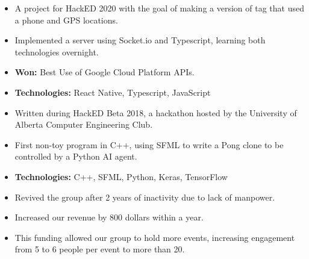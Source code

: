 \documentclass[10pt,a4paper,ragged2e,academicons]{altacv}
\begin{document}
\begin{paracol}{2}
  \begin{itemize}
    \item A project for HackED 2020 with the goal of making a version of tag that used a phone and GPS locations.
    \item Implemented a server using Socket.io and Typescript, learning both technologies overnight.
    \item \textbf{Won:} Best Use of Google Cloud Platform APIs.
    \item \textbf{Technologies:} React Native, Typescript, JavaScript
  \end{itemize}
  \divider\small

  \begin{itemize}
    \item Written during HackED Beta 2018, a hackathon hosted by the University of Alberta Computer Engineering Club.
    \item First non-toy program in C++, using SFML to write a Pong clone to be controlled by a Python AI agent.
    \item \textbf{Technologies:} C++, SFML, Python, Keras, TensorFlow
  \end{itemize}
  \divider\small

  \switchcolumn{}






  \begin{itemize}
    \item Revived the group after 2 years of inactivity due to lack of manpower.
    \item Increased our revenue by 800 dollars within a year.
    \item This funding allowed our group to hold more events, increasing engagement from 5 to 6 people per event to more than 20.
  \end{itemize}
  \divider\small


\end{paracol}
\end{document}
